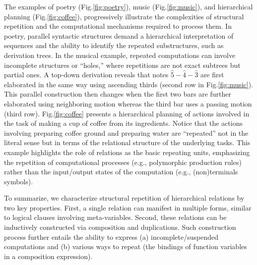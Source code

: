\documentclass[a4paper,11pt]{article}
\begin{document}
    The examples of poetry (Fig.\ref{fig:poetry}), music (Fig.\ref{fig:music}), and hierarchical planning (Fig.\ref{fig:coffee}), progressively illustrate the complexities of structural repetition and the computational mechanisms required to process them.
    In poetry, parallel syntactic structures demand a hierarchical interpretation of sequences and the ability to identify the repeated substructures, such as derivation trees. 
    In the musical example, repeated computations can involve incomplete structures or ``holes,'' where repetitions are not exact subtrees but partial ones. 
    A top-down derivation reveals that notes $\hat{5}-\hat{4}-\hat{3}$ are first elaborated in the same way using ascending thirds (second row in Fig.\ref{fig:music}). This parallel construction then changes when the first two bars are further elaborated using neighboring motion whereas the third bar uses a passing motion (third row). 
    Fig.\ref{fig:coffee} presents a hierarchical planning of actions involved in the task of making a cup of coffee from its ingredients. Notice that the actions involving preparing coffee ground and preparing water are ``repeated'' not in the literal sense but in terms of the relational structure of the underlying tasks. This example highlights the role of relations as the basic repeating units, emphasizing the repetition of computational processes (e.g., polymorphic production rules) rather than the input/output states of the computation (e.g., (non)terminals symbols).

    To summarize, we characterize structural repetition of hierarchical relations by two key properties. First, a single relation can manifest in multiple forms, similar to logical clauses involving meta-variables. Second, these relations can be inductively constructed via composition and duplications. Such construction process further entails the ability to express (a) incomplete/suspended computations and (b) various ways to repeat (the bindings of function variables in a composition expression).

\end{document}
